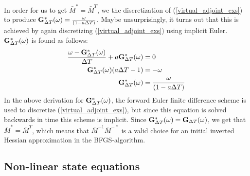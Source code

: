 In order for us to get $\bar{M}^*=\bar{M}^T$, we the discretization of (\ref{virtual_adjoint_exs}) to produce $\bold{G}_{\Delta T}^*(\omega)=\frac{\omega}{(1-a\Delta T)}$. Maybe unsurprisingly, it turns out that this is achieved by again discretizing (\ref{virtual_adjoint_exs}) using implicit Euler. $\bold{G}_{\Delta T}^*(\omega)$ is found as follows:
\begin{align*}
\frac{\omega-\bold{G}_{\Delta T}^*(\omega)}{\Delta T} + a \bold{G}_{\Delta T}^*(\omega)&=0 \\
\bold{G}_{\Delta T}^*(\omega)(a\Delta T-1)&=-\omega \\
\bold{G}_{\Delta T}^*(\omega)&=\frac{\omega}{(1-a\Delta T)}
\end{align*}
In the above derivation for $\bold{G}_{\Delta T}^*(\omega)$, the forward Euler finite difference scheme is used to discretize (\ref{virtual_adjoint_exs}), but since this equation is solved backwards in time this scheme is implicit. Since $\bold{G}_{\Delta T}^*(\omega)=\bold{G}_{\Delta T}(\omega)$, we get that $\bar{M}^*=\bar{M}^T$, which means that $\bar{M}^{-1}\bar{M}^{-*}$ is a valid choice for an initial inverted Hessian approximation in the BFGS-algorithm.
\subsection{Non-linear state equations}

